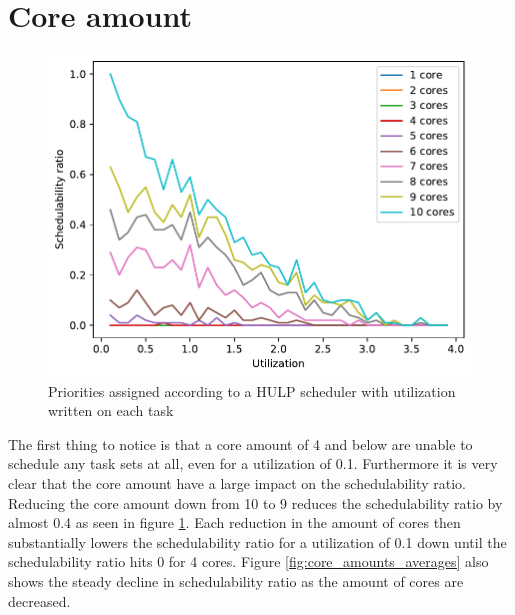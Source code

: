 \documentclass{kththesis}
\begin{document}
\section{Core amount}\label{sec:results_core_amount}

\begin{figure}

    \centering

    \includegraphics[width=0.8\linewidth]{images/core_amounts.pdf}

    \caption{Priorities assigned according to a HULP scheduler with utilization written on each task}

    \label{fig:core_amounts}

\end{figure}

The first thing to notice is that a core amount of 4 and below are unable to schedule any task sets
at all, even for a utilization of 0.1. Furthermore it is very clear that the core amount have a
large impact on the schedulability ratio. Reducing the core amount down from 10 to 9 reduces the
schedulability ratio by almost 0.4 as seen in figure \ref{fig:core_amounts}. Each reduction in the
amount of cores then substantially lowers the schedulability ratio for a utilization of 0.1 down
until the schedulability ratio hits 0 for 4 cores. Figure \ref{fig:core_amounts_averages} also shows
the steady decline in schedulability ratio as the amount of cores are decreased.
\end{document}
